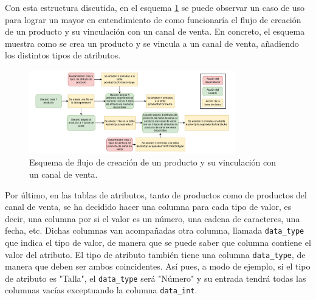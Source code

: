 Con esta estructura discutida, en el esquema \ref{fig:products_db_diagram} se puede observar un caso de uso para lograr un mayor en entendimiento de como funcionaría el flujo de creación de un producto y su vinculación con un canal de venta. En concreto, el esquema muestra como se crea un producto y se vincula a un canal de venta, añadiendo los distintos tipos de atributos.

\begin{figure}[H]
    \centering
    \includegraphics[width=0.8\textwidth]{figures/design_develop/products_db_diagram.pdf}
    \caption{Esquema de flujo de creación de un producto y su vinculación con un canal de venta.}
    \label{fig:products_db_diagram}
\end{figure}

Por último, en las tablas de atributos, tanto de productos como de productos del canal de venta, se ha decidido hacer una columna para cada tipo de valor, es decir, una columna por si el valor es un número, una cadena de caracteres, una fecha, etc. Dichas columnas van acompañadas otra columna, llamada \texttt{data\_type} que indica el tipo de valor, de manera que se puede saber que columna contiene el valor del atributo. El tipo de atributo también tiene una columna \texttt{data\_type}, de manera que deben ser ambos coincidentes. Así pues, a modo de ejemplo, si el tipo de atributo es "Talla", el \texttt{data\_type} será "Número" y su entrada tendrá todas las columnas vacías exceptuando la columna \texttt{data\_int}.

